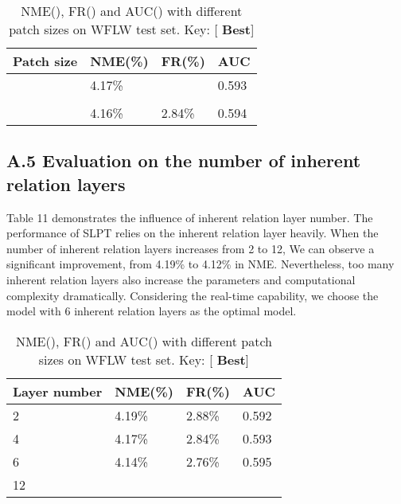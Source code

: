 \documentclass[10pt,twocolumn,letterpaper]{article}
\begin{document}
\begin{table}[H]
	\centering
	\begin{tabular}{|m{2.0cm}<{\centering}|m{1.2cm}<{\centering}|m{1.2cm}<{\centering}|m{1.2cm}<{\centering}|}
		\hline
		Patch size  & NME(\%) & FR(\%) & AUC \\ \hline
		 & 4.17\% & {\color{red}} & 0.593 \\ \hline
		 & {\color{red}} & {\color{red}} & {\color{red}} \\ \hline
		 & 4.16\% & 2.84\% & 0.594 \\ \hline
	\end{tabular}
	\caption{NME(), FR() and AUC() with different patch sizes  on WFLW test set. Key: [{\color{red} \textbf{Best}}]}
	\label{Tabal10}
\end{table}

\subsection*{A.5 Evaluation on the number of inherent relation layers}

Table 11 demonstrates the influence of inherent relation layer number. The performance of SLPT relies on the inherent relation layer heavily. When the number of inherent relation layers increases from 2 to 12, We can observe a significant improvement, from 4.19\% to 4.12\% in NME. Nevertheless, too many inherent relation layers also increase the parameters and computational complexity dramatically. Considering the real-time capability, we choose the model with 6 inherent relation layers as the optimal model.

\begin{table}[H]
	\centering
	\begin{tabular}{|m{2.0cm}<{\centering}|m{1.2cm}<{\centering}|m{1.2cm}<{\centering}|m{1.2cm}<{\centering}|}
		\hline
		Layer number & NME(\%) & FR(\%) & AUC \\ \hline
		2 & 4.19\% & 2.88\% & 0.592 \\ \hline
		4 & 4.17\% & 2.84\% & 0.593 \\ \hline
		6 & 4.14\% & 2.76\% & 0.595 \\ \hline
		12 & {\color{red}} & {\color{red}} & {\color{red}} \\ \hline
	\end{tabular}
	\caption{NME(), FR() and AUC() with different patch sizes  on WFLW test set. Key: [{\color{red} \textbf{Best}}]}
	\label{Tabal11}
\end{table}
\end{document}
